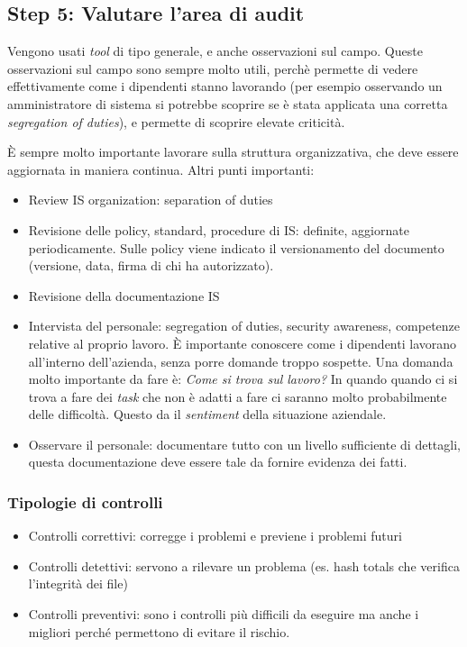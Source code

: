\subsection{Step 5: Valutare l'area di audit}

Vengono usati \textit{tool} di tipo generale, e anche osservazioni sul campo. 
Queste osservazioni sul campo sono sempre molto utili, perchè permette di 
vedere effettivamente come i dipendenti stanno lavorando (per esempio osservando 
un amministratore di sistema si potrebbe scoprire se è stata applicata una 
corretta \textit{segregation of duties}), e permette di scoprire elevate 
criticità.


È sempre molto importante lavorare sulla struttura organizzativa, che deve 
essere aggiornata in maniera continua.
Altri punti importanti:
\begin{itemize}
\item Review IS organization: separation of duties
\item Revisione delle policy, standard, procedure di IS: definite, aggiornate 
periodicamente. Sulle policy viene indicato il versionamento del documento 
(versione, data, firma di chi ha autorizzato).
\item Revisione della documentazione IS
\item Intervista del personale: segregation of duties, security awareness, 
competenze relative al proprio lavoro. È importante conoscere come i dipendenti 
lavorano all'interno dell'azienda, senza porre domande troppo sospette. Una 
domanda molto importante da fare è: \textit{Come si trova sul lavoro?} In 
quando quando ci si trova a fare dei \textit{task} che non è adatti a fare ci 
saranno molto probabilmente delle difficoltà. Questo da il \textit{sentiment} 
della situazione aziendale.
\item Osservare il personale: documentare tutto 
con un livello sufficiente di dettagli, questa documentazione deve essere tale 
da fornire evidenza dei fatti.

\end{itemize}


\subsubsection{Tipologie di controlli}


\begin{itemize}
\item Controlli correttivi: corregge i problemi e previene i problemi futuri
\item Controlli detettivi: servono a rilevare un problema (es. hash totals che 
verifica l'integrità dei file)
\item Controlli preventivi: sono i controlli più difficili da eseguire ma anche 
i migliori perché permettono di evitare il rischio.
\end{itemize}

